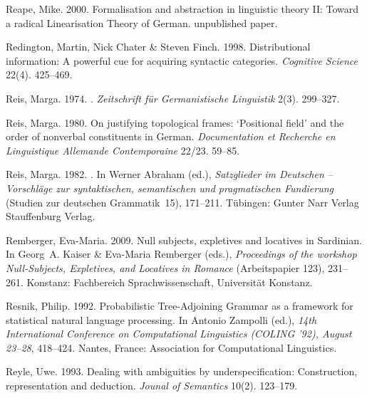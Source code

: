 \begin{thebibliography}{1420}
Reape, Mike. 2000.
\newblock Formalisation and abstraction in linguistic theory {II}: {Toward} a
  radical {Linearisation Theory} of {German}.
\newblock unpublished paper.

Redington, Martin, Nick Chater \& Steven Finch. 1998.
\newblock Distributional information: {A} powerful cue for acquiring syntactic
  categories.
\newblock \emph{Cognitive Science} 22(4). 425--469.

Reis, Marga. 1974.
.
\newblock \emph{Zeitschrift f{\"u}r Germanistische Linguistik} 2(3). 299--327.

Reis, Marga. 1980.
\newblock On justifying topological frames: `{Positional} field' and the order
  of nonverbal constituents in {German}.
\newblock \emph{Documentation et Recherche en Linguistique Allemande
  Contemporaine} 22/23. 59--85.

Reis, Marga. 1982.
.
\newblock In Werner Abraham (ed.), \emph{{Satzglieder im Deutschen --
  Vorschl{\"a}ge zur syntaktischen, semantischen und pragmatischen Fundierung}}
  (Studien zur deutschen Grammatik~15), 171--211. T{\"u}bingen: \original
  Gunter Narr Verlag \jetzt Stauffenburg Verlag.

Remberger, Eva-Maria. 2009.
\newblock Null subjects, expletives and locatives in {Sardinian}.
\newblock In Georg~A. Kaiser \& Eva-Maria Remberger (eds.), \emph{Proceedings
  of the workshop \emph{Null-Subjects, Expletives, and Locatives in Romance}}
  (Arbeitspapier 123), 231--261. Konstanz: Fachbereich Sprachwissenschaft,
  Universit{\"a}t Konstanz.

Resnik, Philip. 1992.
\newblock Probabilistic {Tree-Adjoining Grammar} as a framework for statistical
  natural language processing.
\newblock In Antonio Zampolli (ed.), \emph{{14th International Conference on
  Computational Linguistics (COLING '92), August 23--28}}, 418--424. Nantes,
  France: Association for Computational Linguistics.

Reyle, Uwe. 1993.
\newblock Dealing with ambiguities by underspecification: {Construction},
  representation and deduction.
\newblock \emph{Jounal of Semantics} 10(2). 123--179.


\end{thebibliography}
